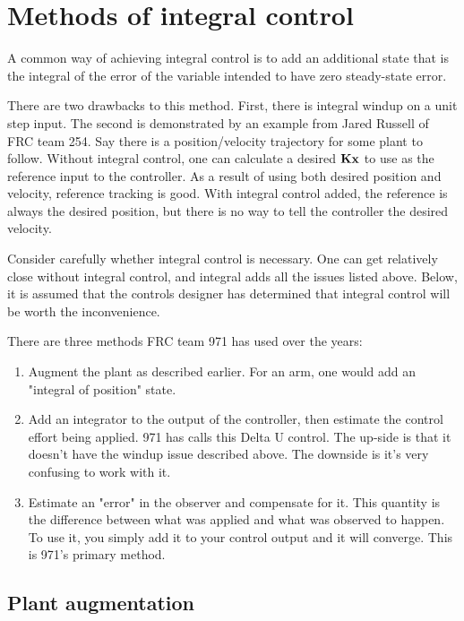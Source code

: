 \chapter{Methods of integral control} \label{ch:integral-control}

A common way of achieving integral control is to add an additional state that is
the integral of the error of the variable intended to have zero steady-state
error.

There are two drawbacks to this method. First, there is integral windup on a
unit step input. The second is demonstrated by an example from Jared Russell of
FRC team 254. Say there is a position/velocity trajectory for some plant to
follow. Without integral control, one can calculate a desired $\mathbf{K}\mathbf{x}$
to use as the reference input to the controller. As a result of using both
desired position and velocity, reference tracking is good. With integral control
added, the reference is always the desired position, but there is no way to tell
the controller the desired velocity.

Consider carefully whether integral control is necessary. One can get relatively
close without integral control, and integral adds all the issues listed above.
Below, it is assumed that the controls designer has determined that integral
control will be worth the inconvenience.

There are three methods FRC team 971 has used over the years:

\begin{enumerate}
  \item Augment the plant as described earlier. For an arm, one would add an
    "integral of position" state.
  \item Add an integrator to the output of the controller, then estimate the
    control effort being applied. 971 has calls this Delta U control. The
    up-side is that it doesn't have the windup issue described above. The
    downside is it's very confusing to work with it.
  \item Estimate an "error" in the observer and compensate for it. This quantity
    is the difference between what was applied and what was observed to happen.
    To use it, you simply add it to your control output and it will converge.
    This is 971's primary method.
\end{enumerate}

\section{Plant augmentation}

